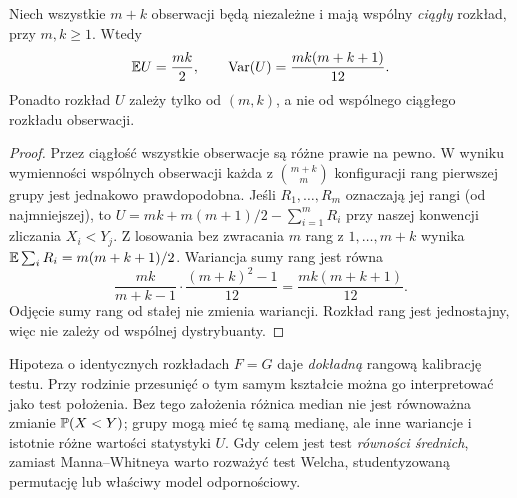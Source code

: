 \begin{twierdzenie}
\label{thm:mann-whitney-moments}
Niech wszystkie $m+k$ obserwacji będą niezależne
i mają wspólny \emph{ciągły} rozkład, przy $m,k\ge1$.
Wtedy
\[
 \mathbb E U=\frac{mk}{2},\qquad
 \operatorname{Var}(U)=\frac{mk(m+k+1)}{12}.
\]
Ponadto rozkład $U$ zależy tylko od $(m,k)$,
a nie od wspólnego ciągłego rozkładu obserwacji.
\end{twierdzenie}
\begin{proof}
Przez ciągłość wszystkie obserwacje są różne prawie na pewno.
W wyniku wymienności wspólnych obserwacji każda z
$\binom{m+k}{m}$ konfiguracji rang pierwszej grupy
jest jednakowo prawdopodobna. Jeśli $R_1,\ldots,R_m$
oznaczają jej rangi (od najmniejszej), to
$U=mk+m(m+1)/2-\sum_{i=1}^mR_i$ przy naszej
konwencji zliczania $X_i<Y_j$.
Z losowania bez zwracania $m$ rang z $1,\ldots,m+k$
wynika $\mathbb E\sum_iR_i=m(m+k+1)/2$.
Wariancja sumy rang jest równa
\[
 \frac{mk}{m+k-1}\cdot
 \frac{(m+k)^2-1}{12}
 =\frac{mk(m+k+1)}{12}.
\]
Odjęcie sumy rang od stałej nie zmienia wariancji.
Rozkład rang jest jednostajny, więc nie zależy od
wspólnej dystrybuanty.
\end{proof}

\begin{uwaga}
Hipoteza o identycznych rozkładach $F=G$ daje
\emph{dokładną} rangową kalibrację testu.
Przy rodzinie przesunięć o tym samym kształcie można
go interpretować jako test położenia.
Bez tego założenia różnica median nie jest równoważna
zmianie $\mathbb P(X<Y)$; grupy mogą mieć tę samą medianę,
ale inne wariancje i istotnie różne wartości statystyki $U$.
Gdy celem jest test \emph{równości średnich}, zamiast
Manna--Whitneya warto rozważyć test Welcha,
studentyzowaną permutację lub właściwy model odpornościowy.
\end{uwaga}

